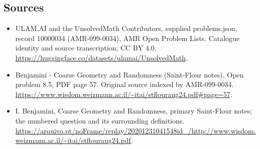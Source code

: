 \documentclass[11pt,a4paper]{article}
\begin{document}
\subsection{Sources}
\begin{itemize}
\item[S1] ULAM.AI and the UnsolvedMath Contributors, supplied problems.json, record 10000034 (AMR-099-0034), AMR Open Problem Lists. Catalogue identity and source transcription; CC BY 4.0.
\url{https://huggingface.co/datasets/ulamai/UnsolvedMath}.
\item[S2] Benjamini - Coarse Geometry and Randomness (Saint-Flour notes), Open problem 8.5, PDF page 57. Original source indexed by AMR-099-0034.
\url{https://www.wisdom.weizmann.ac.il/~itai/stflouraug24.pdf#page=57}.
\item[S3] I. Benjamini, Coarse Geometry and Randomness, primary Saint-Flour notes; the numbered question and its surrounding definitions.
\url{https://arquivo.pt/noFrame/replay/20201231041548id_/http://www.wisdom.weizmann.ac.il/~itai/stflouraug24.pdf}.
\end{itemize}
\end{document}
